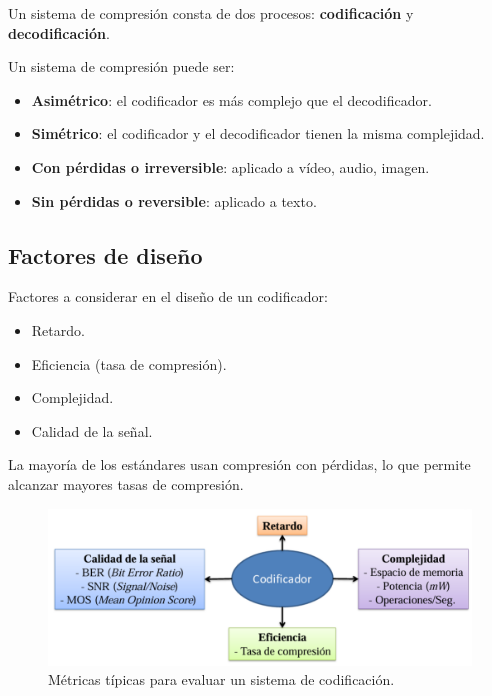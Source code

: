 \documentclass[11pt,a4paper]{article}
\begin{document}
Un sistema de compresión consta de dos procesos: \textbf{codificación} y \textbf{decodificación}.

\begin{NotaBox}
Un sistema de compresión puede ser:
\begin{itemize}
    \item \textbf{Asimétrico}: el codificador es más complejo que el decodificador.
    \item \textbf{Simétrico}: el codificador y el decodificador tienen la misma complejidad.
    \item \textbf{Con pérdidas o irreversible}: aplicado a vídeo, audio, imagen.
    \item \textbf{Sin pérdidas o reversible}: aplicado a texto.
\end{itemize}
\end{NotaBox}

\subsection{Factores de diseño}

\begin{ChecklistBox}
Factores a considerar en el diseño de un codificador:
\begin{itemize}
    \item Retardo.
    \item Eficiencia (tasa de compresión).
    \item Complejidad.
    \item Calidad de la señal.
\end{itemize}
\end{ChecklistBox}

\begin{RecordatorioBox}
La mayoría de los estándares usan compresión con pérdidas, lo que permite alcanzar mayores tasas de compresión.
\end{RecordatorioBox}

\begin{figure}[!htbp]
    \centering
    \includegraphics[width=0.85\linewidth]{resources/Coder_Metrics.png}
    \caption{Métricas típicas para evaluar un sistema de codificación.}
    \label{fig:coder-metrics}
\end{figure}
\end{document}
